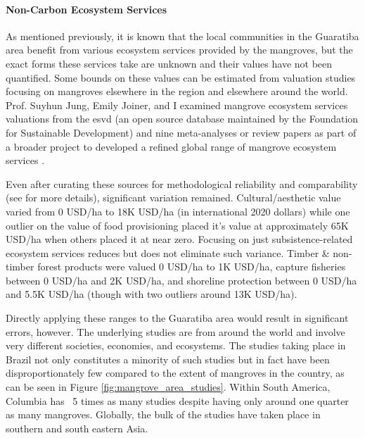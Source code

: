 \paragraph{Non-Carbon Ecosystem Services} \leavevmode\newline

As mentioned previously, it is known that the local communities in the Guaratiba area benefit from various ecosystem services provided by the mangroves, but the exact forms these services take are unknown and their values have not been quantified. Some bounds on these values can be estimated from valuation studies focusing on mangroves elsewhere in the region and elsewhere around the world. Prof. Suyhun Jung, Emily Joiner, and I examined mangrove ecosystem services valuations from the \ac{esvd} \cite{grootEcosystemServicesValuation2020} (an open source database maintained by the Foundation for Sustainable Development) and nine meta-analyses or review papers \cite{branderEmpiricsWetlandValuation2006,branderEcosystemServiceValues2012, salemEconomicValueMangroves2012, veghMangroveEcosystemServices2014, voReviewValuationMethods2012, himes-cornellMangroveEcosystemService2018, getznerEcosystemServicesMangrove2020, barbierProtectiveServiceMangrove2016, barbierEstuarineCoastalEcosystems2020} as part of a broader project to developed a refined global range of mangrove ecosystem services \cite{jungGapsMangroveForestInReview}.

Even after curating these sources for methodological reliability and comparability (see \cite{jungGapsMangroveForestInReview} for more details), significant variation remained. Cultural/aesthetic value varied from 0 USD/ha to 18K USD/ha (in international 2020 dollars) while one outlier on the value of food provisioning placed it's value at approximately 65K USD/ha when others placed it at near zero. Focusing on just subsistence-related ecosystem services reduces but does not eliminate such variance. Timber \& non-timber forest products were valued 0 USD/ha to 1K USD/ha, capture fisheries between 0 USD/ha and 2K USD/ha, and shoreline protection between 0 USD/ha and 5.5K USD/ha (though with two outliers around 13K USD/ha).

Directly applying these ranges to the Guaratiba area would result in significant errors, however. The underlying studies are from around the world and involve very different societies, economies, and ecosystems. The studies taking place in Brazil not only constitutes a minority of such studies but in fact have been disproportionately few compared to the extent of mangroves in the country, as can be seen in Figure \ref{fig:mangrove_area_studies}. Within South America, Columbia has ~5 times as many studies despite having only around one quarter as many mangroves. Globally, the bulk of the studies have taken place in southern and south eastern Asia. 

